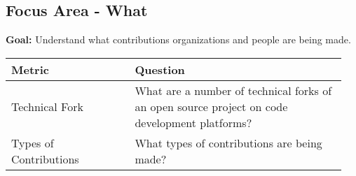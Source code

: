 
\subsection{Focus Area - What}
\textbf{Goal:} Understand what contributions organizations and people are being made.
\begin{table}[ht!]
    \centering
    \begin{tabular}{|p{0.35\linewidth} | p{0.6\linewidth}|}
        \hline
        \hfil \textbf{Metric}  & \hfil \textbf{Question} \\
        \hline
		Technical Fork & What are a number of technical forks of an open source project on code development platforms? \\ 
		\hline
		Types of Contributions & What types of contributions are being made? \\ 
		\hline
    \end{tabular}
\end{table}

 
 
